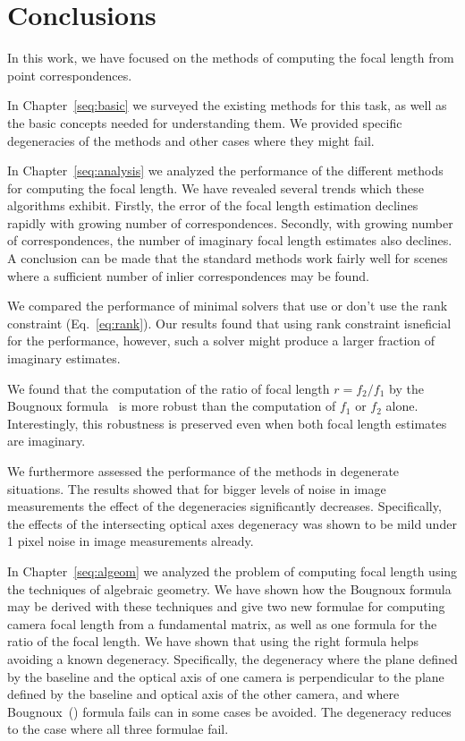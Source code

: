 \chapter{Conclusions}

In this work, we have focused on the methods of computing the focal length from point correspondences. 

In Chapter~\ref{seq:basic} we surveyed the existing methods for this task, as well as the basic concepts needed for understanding them. We provided specific degeneracies of the methods and other cases where they might fail.
 
In Chapter~\ref{seq:analysis} we analyzed the performance of the different methods for computing the focal length. We have revealed several trends which these algorithms exhibit. Firstly, the error of the focal length estimation declines rapidly with growing number of correspondences. Secondly, with growing number of correspondences, the number of imaginary focal length estimates also declines. A conclusion can be made that the standard methods work fairly well for scenes where a sufficient number of inlier correspondences may be found.

We compared the performance of minimal solvers that use or don't use the rank constraint (Eq.~\ref{eq:rank}). Our results found that using rank constraint isneficial for the performance, however, such a solver might produce a larger fraction of imaginary estimates.

We found that  the computation of the ratio of focal length $r= f_2 \slash f_1$ by the Bougnoux formula~\cite{Bougnoux} is more robust than the computation of $f_1$ or $f_2$ alone. Interestingly, this robustness is preserved even when both focal length estimates are imaginary.

We furthermore assessed the performance of the methods in  degenerate situations. The results showed that for bigger levels of noise in image measurements the effect of the degeneracies significantly decreases. Specifically, the effects of the intersecting optical axes degeneracy was shown to be mild under 1 pixel noise in image measurements already.


In Chapter~\ref{seq:algeom} we analyzed the problem of computing focal length using the techniques of algebraic geometry. We have shown how the Bougnoux formula may be derived with these techniques and give two new formulae for computing camera focal length from a fundamental matrix, as well as one formula for the ratio of the focal length.  We have shown that using the right formula helps avoiding a known degeneracy. Specifically, the degeneracy where the plane defined by the baseline and the optical axis of one camera is perpendicular to the plane defined by the baseline and optical axis of the other camera, and where Bougnoux~(\cite{Bougnoux}) formula fails can in some cases be avoided. The degeneracy reduces to the case where all three formulae fail.


